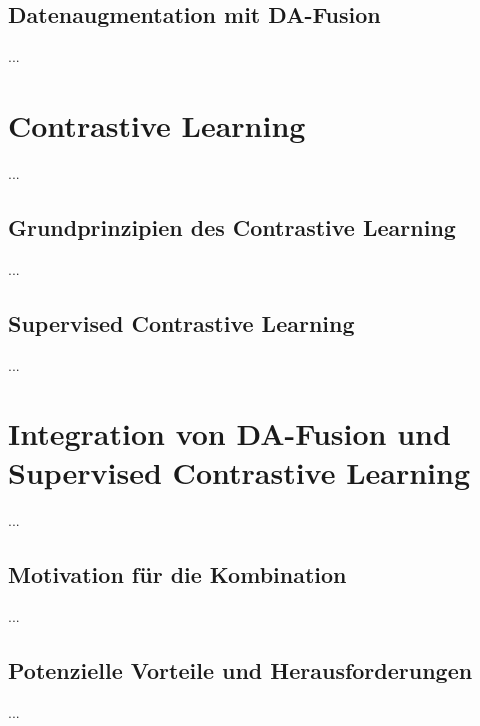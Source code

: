 \subsection{Datenaugmentation mit DA-Fusion}

...

\section{Contrastive Learning}

...

\subsection{Grundprinzipien des Contrastive Learning}

...

\subsection{Supervised Contrastive Learning}

...

\section{Integration von DA-Fusion und Supervised Contrastive Learning}

...

\subsection{Motivation für die Kombination}

...

\subsection{Potenzielle Vorteile und Herausforderungen}

...
